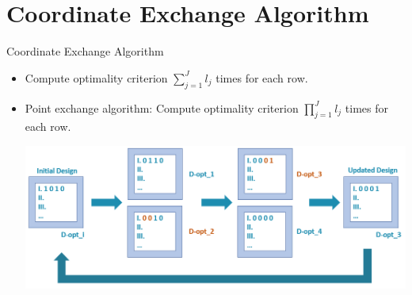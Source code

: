 \documentclass[11pt,t]{beamer}
\begin{document}
\section{Coordinate Exchange Algorithm}
\begin{frame}[fragile]{Coordinate Exchange Algorithm}
\begin{itemize}
	\item Compute optimality criterion $\sum_{j=1}^J l_j$ times for each row.
	\item Point exchange algorithm: Compute optimality criterion $\prod_{j=1}^J l_j$ times for each row.

	\vspace{5mm}
	\hspace{-8mm}	\includegraphics[scale = .55]{mygraphics/Coord.png}
\end{itemize}
\end{frame}
\end{document}
